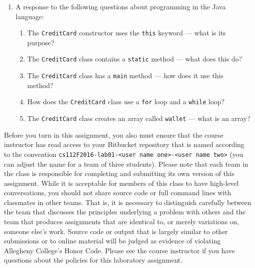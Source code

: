 \begin{enumerate}
\begin{enumerate}
      \item A response to the following questions about programming in the Java language:

        \begin{enumerate}
          \itemsep 0em

          \item The {\tt CreditCard} constructor uses the {\tt this} keyword --- what is its purpose?

          \item The {\tt CreditCard} class contains a {\tt static} method --- what does this do?

          \item The {\tt CreditCard} class has a {\tt main} method --- how does it use this method?

          \item How does the {\tt CreditCard} class use a {\tt for} loop and a {\tt while} loop?

          \item The {\tt CreditCard} class creates an array called {\tt wallet} --- what is an array?

        \end{enumerate}

    \end{enumerate}

\end{enumerate}

\vspace*{-.05in}

Before you turn in this assignment, you also must ensure that the course instructor has read access to your Bitbucket
repository that is named according to the convention {\tt cs112F2016-lab01-<user name one>-<user name two>} (you can
adjust the name for a team of three students). Please note that each team in the class is responsible for completing and
submitting its own version of this assignment. While it is acceptable for members of this class to have high-level
conversations, you should not share source code or full command lines with classmates in other teams. That is, it is
necessary to distinguish carefully between the team that discusses the principles underlying a problem with others and
the team that produces assignments that are identical to, or merely variations on, someone else's work.  Source code or
output that is largely similar to other submissions or to online material will be judged as evidence of violating
Allegheny College's Honor Code. Please see the course instructor if you have questions about the policies for this
laboratory assignment.


